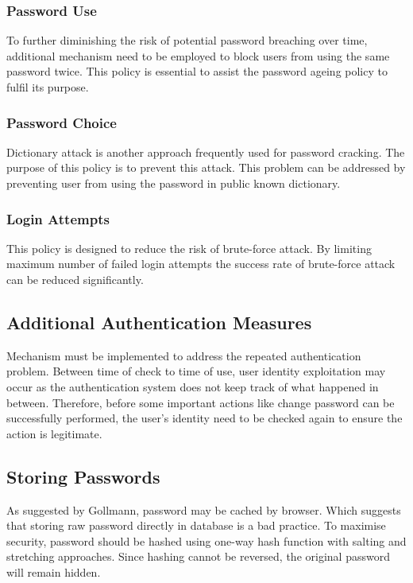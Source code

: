 \documentclass{article}
\begin{document}
\subsubsection{Password Use}
To further diminishing the risk of potential password breaching over time, additional mechanism 
need to be employed to block users from using the same password twice. This policy is essential 
to assist the password ageing policy to fulfil its purpose.

\subsubsection{Password Choice}
Dictionary attack is another approach frequently used for password cracking. The purpose of 
this policy is to prevent this attack. This problem can be addressed by preventing user from 
using the password in public known dictionary.

\subsubsection{Login Attempts}
This policy is designed to reduce the risk of brute-force attack. By limiting maximum number of 
failed login attempts the success rate of brute-force attack can be reduced significantly.

\subsection{Additional Authentication Measures}
Mechanism must be implemented to address the repeated authentication problem. 
Between time of check to time of use, user identity exploitation may occur as the 
authentication system does not keep track of what happened in between. 
Therefore, before some important actions like change password can be successfully performed, 
the user's identity need to be checked again to ensure the action is legitimate.

\subsection{Storing Passwords}
As suggested by Gollmann, password may be cached by browser\cite{GollmannDieter2011Cs/D}. Which 
suggests that storing raw password directly in database is a bad practice. To maximise security, 
password should be hashed using one-way hash function with salting and stretching approaches\cite{FergusonNiels2010Ce:d}.
Since hashing cannot be reversed, the original password will remain hidden.
\end{document}
